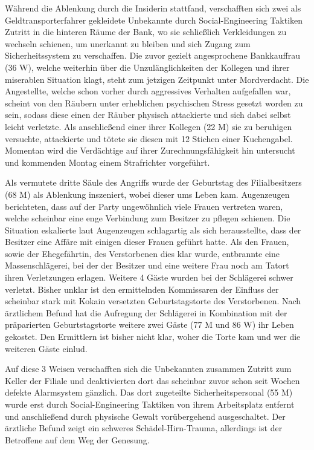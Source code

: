 \documentclass[final]{multiversum}
\begin{document}
Während die Ablenkung durch die Insiderin stattfand, verschafften sich zwei als
Geldtransporterfahrer gekleidete Unbekannte durch Social-Engineering Taktiken
Zutritt in die hinteren Räume der Bank, wo sie schließlich Verkleidungen zu
wechseln schienen, um unerkannt zu bleiben und sich Zugang zum Sicherheitssystem
zu verschaffen. Die zuvor gezielt angesprochene Bankkauffrau (36 W), welche
weiterhin über die Unzulänglichkeiten der Kollegen und ihrer miserablen
Situation klagt, steht zum jetzigen Zeitpunkt unter Mordverdacht. Die
Angestellte, welche schon vorher durch aggressives Verhalten aufgefallen war,
scheint von den Räubern unter erheblichen psychischen Stress gesetzt worden zu
sein, sodass diese einen der Räuber physisch attackierte und sich dabei selbst
leicht verletzte. Als anschließend einer ihrer Kollegen (22 M) sie zu beruhigen
versuchte, attackierte und tötete sie diesen mit 12 Stichen einer Kuchengabel.
Momentan wird die Verdächtige auf ihrer Zurechnungsfähigkeit hin untersucht und
kommenden Montag einem Strafrichter vorgeführt.

Als vermutete dritte Säule des Angriffs wurde der Geburtstag des Filialbesitzers
(68 M) als Ablenkung inszeniert, wobei dieser ums Leben kam. Augenzeugen
berichteten, dass auf der Party ungewöhnlich viele Frauen vertreten waren,
welche scheinbar eine enge Verbindung zum Besitzer zu pflegen schienen. Die
Situation eskalierte laut Augenzeugen schlagartig als sich herausstellte, dass
der Besitzer eine Affäre mit einigen dieser Frauen geführt hatte. Als den
Frauen, sowie der Ehegefährtin, des Verstorbenen dies klar wurde, entbrannte
eine Massenschlägerei, bei der der Besitzer und eine weitere Frau noch am Tatort
ihren Verletzungen erlagen. Weitere 4 Gäste wurden bei der Schlägerei schwer
verletzt. Bisher unklar ist den ermittelnden Kommissaren der Einfluss der
scheinbar stark mit Kokain versetzten Geburtstagstorte des Verstorbenen. Nach
ärztlichem Befund hat die Aufregung der Schlägerei in Kombination mit der
präparierten Geburtstagstorte weitere zwei Gäste (77 M und 86 W) ihr Leben
gekostet. Den Ermittlern ist bisher nicht klar, woher die Torte kam und wer die
weiteren Gäste einlud.

Auf diese 3 Weisen verschafften sich die Unbekannten zusammen Zutritt zum Keller
der Filiale und deaktivierten dort das scheinbar zuvor schon seit Wochen defekte
Alarmsystem gänzlich. Das dort zugeteilte Sicherheitspersonal (55 M) wurde erst
durch Social-Engineering Taktiken von ihrem Arbeitsplatz entfernt und
anschließend durch physische Gewalt vorübergehend ausgeschaltet. Der ärztliche
Befund zeigt ein schweres Schädel-Hirn-Trauma, allerdings ist der Betroffene auf
dem Weg der Genesung.
\end{document}
